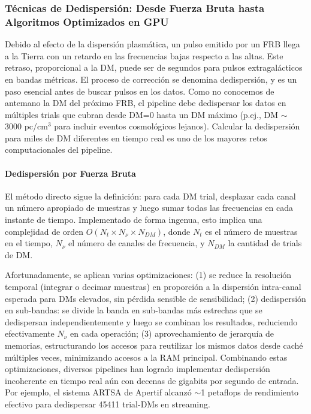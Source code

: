 \subsubsection{Técnicas de Dedispersión: Desde Fuerza Bruta hasta Algoritmos Optimizados en GPU}

Debido al efecto de la dispersión plasmática, un pulso emitido por un FRB llega a la Tierra con un retardo en las frecuencias bajas respecto a las altas. Este retraso, proporcional a la DM, puede ser de segundos para pulsos extragalácticos en bandas métricas. El proceso de corrección se denomina dedispersión, y es un paso esencial antes de buscar pulsos en los datos. Como no conocemos de antemano la DM del próximo FRB, el pipeline debe dedispersar los datos en múltiples trials que cubran desde DM=0 hasta un DM máximo (p.ej., DM $\sim$ 3000 pc/cm$^3$ para incluir eventos cosmológicos lejanos). Calcular la dedispersión para miles de DM diferentes en tiempo real es uno de los mayores retos computacionales del pipeline.

\paragraph{Dedispersión por Fuerza Bruta}

El método directo sigue la definición: para cada DM trial, desplazar cada canal un número apropiado de muestras y luego sumar todas las frecuencias en cada instante de tiempo. Implementado de forma ingenua, esto implica una complejidad de orden $O(N_t \times N_\nu \times N_{DM})$, donde $N_t$ es el número de muestras en el tiempo, $N_\nu$ el número de canales de frecuencia, y $N_{DM}$ la cantidad de trials de DM.

Afortunadamente, se aplican varias optimizaciones: (1) se reduce la resolución temporal (integrar o decimar muestras) en proporción a la dispersión intra-canal esperada para DMs elevados, sin pérdida sensible de sensibilidad; (2) dedispersión en sub-bandas: se divide la banda en sub-bandas más estrechas que se dedispersan independientemente y luego se combinan los resultados, reduciendo efectivamente $N_\nu$ en cada operación; (3) aprovechamiento de jerarquía de memorias, estructurando los accesos para reutilizar los mismos datos desde caché múltiples veces, minimizando accesos a la RAM principal. Combinando estas optimizaciones, diversos pipelines han logrado implementar dedispersión incoherente en tiempo real aún con decenas de gigabits por segundo de entrada. Por ejemplo, el sistema ARTSA de Apertif alcanzó $\sim$1 petaflops de rendimiento efectivo para dedispersar 45411 trial-DMs en streaming.

